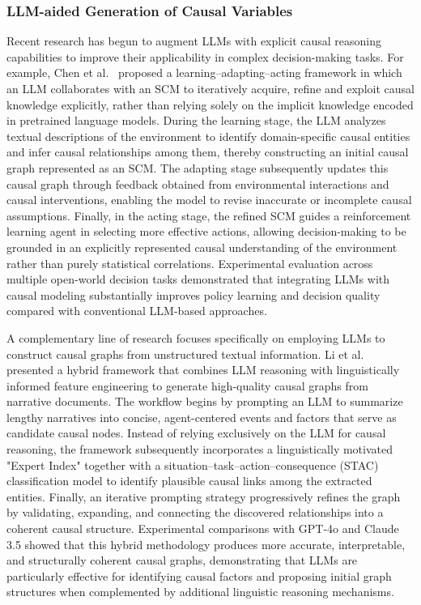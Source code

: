 \documentclass{sfuthesis}
\begin{document}
\subsubsection{LLM-aided Generation of Causal Variables}
Recent research has begun to augment LLMs with explicit causal reasoning capabilities to improve their applicability in complex decision-making tasks. For example, Chen et al.~\cite{chen2025causal} proposed a learning–adapting–acting framework in which an LLM collaborates with an SCM to iteratively acquire, refine and exploit causal knowledge explicitly, rather than relying solely on the implicit knowledge encoded in pretrained language models. During the learning stage, the LLM analyzes textual descriptions of the environment to identify domain-specific causal entities and infer causal relationships among them, thereby constructing an initial causal graph represented as an SCM. The adapting stage subsequently updates this causal graph through feedback obtained from environmental interactions and causal interventions, enabling the model to revise inaccurate or incomplete causal assumptions. Finally, in the acting stage, the refined SCM guides a reinforcement learning agent in selecting more effective actions, allowing decision-making to be grounded in an explicitly represented causal understanding of the environment rather than purely statistical correlations. Experimental evaluation across multiple open-world decision tasks demonstrated that integrating LLMs with causal modeling substantially improves policy learning and decision quality compared with conventional LLM-based approaches.

A complementary line of research focuses specifically on employing LLMs to construct causal graphs from unstructured textual information. Li et al.~\cite{li2025beyond} presented a hybrid framework that combines LLM reasoning with linguistically informed feature engineering to generate high-quality causal graphs from narrative documents. The workflow begins by prompting an LLM to summarize lengthy narratives into concise, agent-centered events and factors that serve as candidate causal nodes. Instead of relying exclusively on the LLM for causal reasoning, the framework subsequently incorporates a linguistically motivated "Expert Index" together with a situation–task–action–consequence (STAC) classification model to identify plausible causal links among the extracted entities. Finally, an iterative prompting strategy progressively refines the graph by validating, expanding, and connecting the discovered relationships into a coherent causal structure. Experimental comparisons with GPT-4o and Claude 3.5 showed that this hybrid methodology produces more accurate, interpretable, and structurally coherent causal graphs, demonstrating that LLMs are particularly effective for identifying causal factors and proposing initial graph structures when complemented by additional linguistic reasoning mechanisms.
\end{document}
